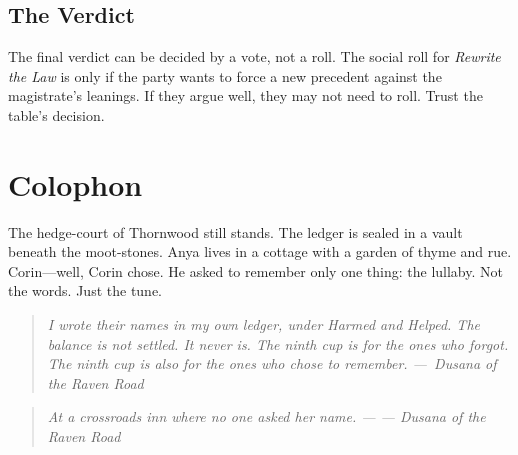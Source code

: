 \documentclass[12pt]{book}
\newcommand{\dusana}[1]{%
    \begin{quote}\itshape #1 ---~Dusana of the Raven Road\end{quote}}
\newcommand{\letter}[2]{%
    \begin{quote}\small\itshape #1 \hfill --- #2\end{quote}}
\begin{document}
\section{The Verdict}

The final verdict can be decided by a vote, not a roll. The social roll for \textit{Rewrite the Law} is only if the party wants to force a new precedent against the magistrate's leanings. If they argue well, they may not need to roll. Trust the table's decision.

\chapter{Colophon}

The hedge-court of Thornwood still stands. The ledger is sealed in a vault beneath the moot-stones. Anya lives in a cottage with a garden of thyme and rue. Corin---well, Corin chose. He asked to remember only one thing: the lullaby. Not the words. Just the tune.

\vspace{1em}
\dusana{I wrote their names in my own ledger, under \textit{Harmed} and \textit{Helped}. The balance is not settled. It never is. The ninth cup is for the ones who forgot. The ninth cup is also for the ones who chose to remember.}

\vspace{1em}
\letter{At a crossroads inn where no one asked her name.}{--- Dusana of the Raven Road}
\end{document}
